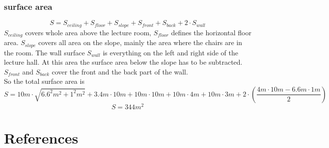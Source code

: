 \documentclass{article}
\begin{document}
\subsubsection{surface area}
\begin{equation}
S=S_{ceiling}+S_{floor}+S_{slope}+S_{front}+S_{back}+2\cdot S_{wall}
\end{equation}
$S_{ceiling}$ covers whole area above the lecture room, $S_{floor}$ defines the horizontal floor area. $S_{slope}$ covers all area on the slope, mainly the area where the chairs are in the room. The wall surface $S_{wall}$ is everything on the left and right side of the lecture hall. At this area the surface area below the slope has to be subtracted. $S_{front}$ and $S_{back}$ cover the front and the back part of the wall.\\
So the total surface area is
$$S=10m\cdot\sqrt{6.6^2m^2+1^2m^2}+3.4m\cdot 10m+10m\cdot 10m+10m\cdot 4m+10m\cdot 3m+2\cdot(\frac{4m\cdot 10m-6.6m\cdot 1m}{2})$$
$$S=344m^2$$
\newpage
\section{References}
\end{document}
